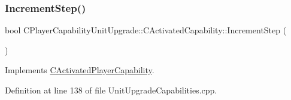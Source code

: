 \hypertarget{classCPlayerCapabilityUnitUpgrade_1_1CActivatedCapability_a86833312cb2f2460e923808fe0e19223}{}\label{classCPlayerCapabilityUnitUpgrade_1_1CActivatedCapability_a86833312cb2f2460e923808fe0e19223} 
\subsubsection{\texorpdfstring{Increment\+Step()}{IncrementStep()}}
{\footnotesize\ttfamily bool C\+Player\+Capability\+Unit\+Upgrade\+::\+C\+Activated\+Capability\+::\+Increment\+Step (\begin{DoxyParamCaption}{ }\end{DoxyParamCaption})\hspace{0.3cm}{\ttfamily [virtual]}}



Implements \hyperlink{classCActivatedPlayerCapability_a943b5999a57504399293250382c0ec6a}{C\+Activated\+Player\+Capability}.



Definition at line 138 of file Unit\+Upgrade\+Capabilities.\+cpp.



